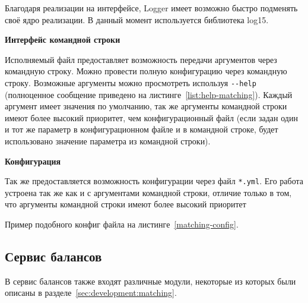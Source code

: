 Благодаря реализации на интерфейсе, Logger имеет возможно быстро подменять своё ядро реализации. В данный момент используется библиотека log15.

\textbf{Интерфейс командной строки}

Исполняемый файл предоставляет возможность передачи аргументов через командную строку. Можно провести полную конфигурацию через командную строку. Возможные аргументы можно просмотреть используя \lstinline{--help} (полноценное сообщение приведено на листинге~\ref{list:help-matching}). Каждый аргумент имеет значения по умолчанию, так же аргументы командной строки имеют более высокий приоритет, чем конфигурационный файл (если задан один и тот же параметр в конфигурационном файле и в командной строке, будет использовано значение параметра из командной строки).



\textbf{Конфигурация}

Так же предоставляется возможность конфигурации через файл \lstinline{*.yml}. Его работа устроена так же как и с аргументами командной строки, отличие только в том, что аргументы командной строки имеют более высокий приоритет

Пример подобного конфиг файла на листинге~\ref{matching-config}.



\subsection{Сервис балансов}

В сервис балансов также входят различные модули, некоторые из которых были описаны в разделе~\ref{sec:development:matching}.


